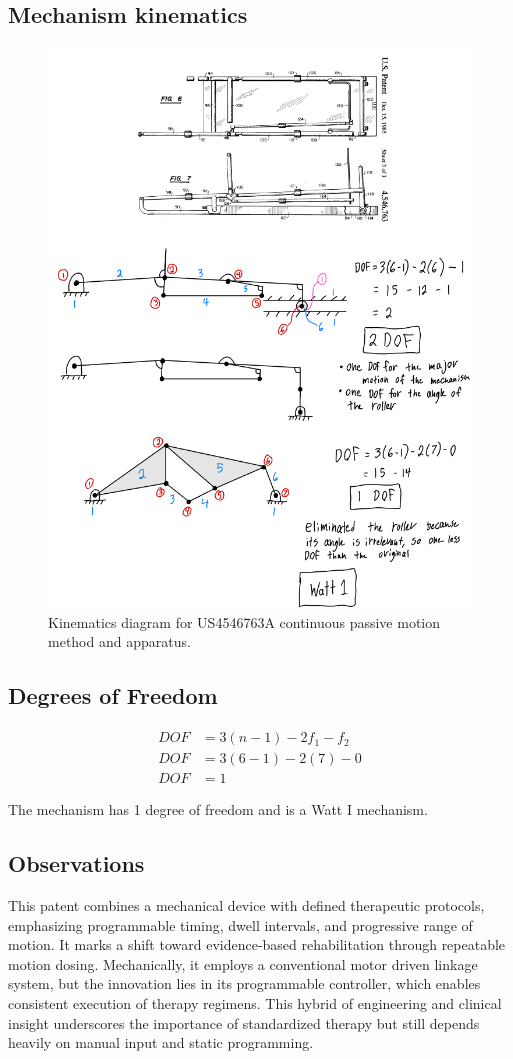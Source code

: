 \documentclass[11pt]{article}
\begin{document}
\subsection{Mechanism kinematics}
\begin{figure}[H]
  \centering
  \includegraphics[width=0.54\linewidth]{../Kinematic Mechanism Images/4546763.png}
  \caption{Kinematics diagram for US4546763A continuous passive motion method and apparatus.}
  \label{fig:US4546763A_kinematics}
\end{figure}

\subsection{Degrees of Freedom}
\[
\begin{aligned}
DOF &= 3(n-1) - 2f_1 - f_2 \\
DOF &= 3(6-1) - 2(7) - 0 \\
DOF &= 1
\end{aligned}
\]

The mechanism has 1 degree of freedom and is a Watt I mechanism.

\subsection{Observations}
This patent combines a mechanical device with defined therapeutic protocols, emphasizing programmable timing, dwell intervals, and progressive range of motion. It marks a shift toward evidence-based rehabilitation through repeatable motion dosing. Mechanically, it employs a conventional motor driven linkage system, but the innovation lies in its programmable controller, which enables consistent execution of therapy regimens. This hybrid of engineering and clinical insight underscores the importance of standardized therapy but still depends heavily on manual input and static programming.
\end{document}
